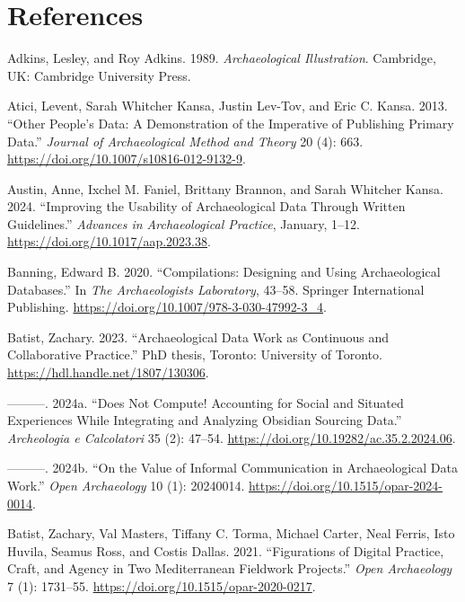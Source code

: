 \documentclass[
]{article}
\newlength{\cslhangindent}
\newenvironment{CSLReferences}[2] %
 {\begin{list}{}{%
  \setlength{\itemindent}{0pt}
  \setlength{\leftmargin}{0pt}
  \setlength{\parsep}{0pt}
  \ifodd #1
   \setlength{\leftmargin}{\cslhangindent}
   \setlength{\itemindent}{-1\cslhangindent}
  \fi
  \setlength{\itemsep}{#2\baselineskip}}}
 {\end{list}}
\begin{document}
\section{References}\label{references}

\label{refs}
\begin{CSLReferences}{1}{0}
Adkins, Lesley, and Roy Adkins. 1989. \emph{Archaeological
{Illustration}}. Cambridge, UK: Cambridge University Press.

Atici, Levent, Sarah Whitcher Kansa, Justin Lev-Tov, and Eric C. Kansa.
2013. {``Other {People}'s {Data}: {A Demonstration} of the {Imperative}
of {Publishing Primary Data}.''} \emph{Journal of Archaeological Method
and Theory} 20 (4): 663.
\url{https://doi.org/10.1007/s10816-012-9132-9}.

Austin, Anne, Ixchel M. Faniel, Brittany Brannon, and Sarah Whitcher
Kansa. 2024. {``Improving the {Usability} of {Archaeological Data}
Through {Written Guidelines}.''} \emph{Advances in Archaeological
Practice}, January, 1--12. \url{https://doi.org/10.1017/aap.2023.38}.

Banning, Edward B. 2020. {``Compilations: {Designing} and Using
Archaeological Databases.''} In \emph{The Archaeologists Laboratory},
43--58. Springer International Publishing.
\url{https://doi.org/10.1007/978-3-030-47992-3_4}.

Batist, Zachary. 2023. {``Archaeological Data Work as Continuous and
Collaborative Practice.''} PhD thesis, Toronto: University of Toronto.
\url{https://hdl.handle.net/1807/130306}.

---------. 2024a. {``Does Not Compute! {Accounting} for Social and
Situated Experiences While Integrating and Analyzing Obsidian Sourcing
Data.''} \emph{Archeologia e Calcolatori} 35 (2): 47--54.
\url{https://doi.org/10.19282/ac.35.2.2024.06}.

---------. 2024b. {``On the {Value} of {Informal Communication} in
{Archaeological Data Work}.''} \emph{Open Archaeology} 10 (1): 20240014.
\url{https://doi.org/10.1515/opar-2024-0014}.

Batist, Zachary, Val Masters, Tiffany C. Torma, Michael Carter, Neal
Ferris, Isto Huvila, Seamus Ross, and Costis Dallas. 2021.
{``Figurations of {Digital Practice}, {Craft}, and {Agency} in {Two
Mediterranean Fieldwork Projects}.''} \emph{Open Archaeology} 7 (1):
1731--55. \url{https://doi.org/10.1515/opar-2020-0217}.


\end{CSLReferences}
\end{document}
